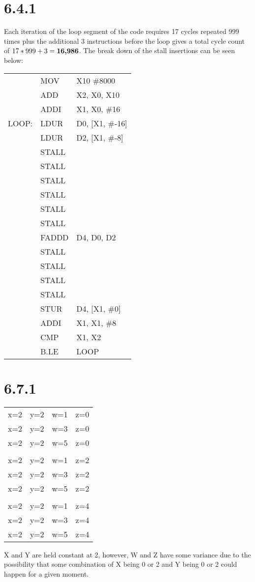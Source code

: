 	\part{6.4.1}
		Each iteration of the loop segment of the code requires 17 cycles repeated 999 times plus the additional 3 instructions before the loop gives a total cycle count of $17 * 999 + 3 = \textnormal{\textbf{16,986}}$.
		The break down of the stall insertions can be seen below:
		\begin{center}
		\begin{tabular}{lll}
			& MOV & X10 \#8000\\
			& ADD & X2, X0, X10\\
			& ADDI & X1, X0, \#16\\
			LOOP: & LDUR & D0, [X1, \#-16]\\
			& LDUR & D2, [X1, \#-8]\\
			& STALL & \\
			& STALL & \\
			& STALL & \\
			& STALL & \\
			& STALL & \\
			& STALL & \\
			& FADDD & D4, D0, D2\\
			& STALL & \\
			& STALL & \\
			& STALL & \\
			& STALL & \\
			& STUR & D4, [X1, \#0]\\
			& ADDI & X1, X1, \#8\\
			& CMP & X1, X2\\
			& B.LE & LOOP\\
		\end{tabular}
		\end{center}
	
	

	\part{6.7.1}
		\begin{center}
		\begin{tabular}{cccc}
			x=2 & y=2 & w=1 & z=0\\
			x=2 & y=2 & w=3 & z=0\\
			x=2 & y=2 & w=5 & z=0\\
			\\
			x=2 & y=2 & w=1 & z=2\\
			x=2 & y=2 & w=3 & z=2\\
			x=2 & y=2 & w=5 & z=2\\
			\\
			x=2 & y=2 & w=1 & z=4\\
			x=2 & y=2 & w=3 & z=4\\
			x=2 & y=2 & w=5 & z=4\\
		\end{tabular}
		\end{center}\par
		X and Y are held constant at 2, however, W and Z have some variance due to the possibility that some combination of X being 0 or 2 and Y being 0 or 2 could happen for a given moment.
	
